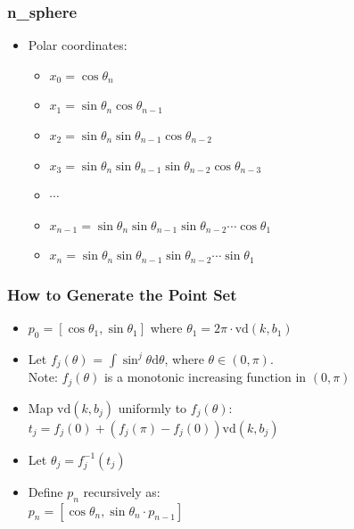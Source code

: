 \documentclass[serif]{beamer} %
\begin{document}
\begin{frame}
  \frametitle{n_sphere}
  \begin{itemize}
    \item Polar coordinates:
    \begin{itemize}
      \item $x_0 = \cos\theta_n$
      \item $x_1 = \sin\theta_n \cos\theta_{n-1}$
      \item $x_2 = \sin\theta_n \sin\theta_{n-1} \cos\theta_{n-2} $
      \item $x_3 = \sin\theta_n \sin\theta_{n-1} \sin\theta_{n-2} \cos\theta_{n-3} $
      \item $\cdots$
      \item $x_{n-1} = \sin\theta_n \sin\theta_{n-1} \sin\theta_{n-2} \cdots \cos\theta_1$
      \item $x_n = \sin\theta_n \sin\theta_{n-1} \sin\theta_{n-2} \cdots \sin\theta_1$
    \end{itemize}
  \end{itemize}
\end{frame}

\begin{frame}
  \frametitle{How to Generate the Point Set}
  \begin{itemize}
    \item $p_0 = [\cos\theta_1, \sin\theta_1]$ where $\theta_1 = 2\pi\cdot\mathrm{vd}(k,b_1)$
    \item Let $f_j(\theta)$ = $\int\sin^j\theta \mathrm{d}\theta$, where $\theta\in (0,\pi)$. \\
    Note: $f_j(\theta)$ is a monotonic increasing function in $(0,\pi) $
    \item Map $\mathrm{vd}(k,b_j)$ uniformly to $f_j(\theta)$:\\
     $t_j = f_j(0) + (f_j(\pi) - f_j(0)) \mathrm{vd}(k,b_j)$
    \item Let $\theta_j = f_j^{-1}(t_j)$
    \item Define $p_n$ recursively as: \\
          $p_n = [\cos\theta_n, \sin\theta_n \cdot p_{n-1}]$
  \end{itemize}
\end{frame}
\end{document}
